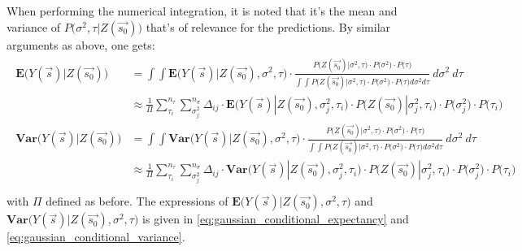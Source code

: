 \documentclass{article}
\begin{document}
When performing the numerical integration, it is noted that it's the mean and variance of $P\big( \sigma^2, \tau | Z(\vec{s_0}) \big)$ that's of relevance for the predictions. By similar arguments as above, one gets:
\begin{align}\label{eq:expected_variance_grf_posterior}
\begin{split}
\mathbf{E} \big( Y(\vec{s}) | Z(\vec{s_0}) \big) &= \int \int \mathbf{E} \big( Y(\vec{s}) | Z(\vec{s_0}), \sigma^2, \tau \big) \cdot \frac{P\big( Z(\vec{s_0}) | \sigma^2, \tau \big) \cdot P\big( \sigma^2 \big) \cdot P\big( \tau \big)}{\int \int P\big( Z(\vec{s_0}) | \sigma^2, \tau \big) \cdot P\big( \sigma^2 \big) \cdot P\big( \tau \big) d\sigma^2 d\tau} \ d\sigma^2 \ d\tau \\
&\approx \frac{1}{\Pi}\sum_{\tau_i}^{n_{\tau}} \sum_{\sigma^2_j}^{n_{\sigma}} \Delta_{ij} \cdot \mathbf{E} \big( Y(\vec{s}) | Z(\vec{s_0}), \sigma^2_j, \tau_i \big) \cdot P\big( Z(\vec{s_0}) | \sigma^2_j, \tau_i \big) \cdot P\big( \sigma^2_j \big) \cdot P\big( \tau_i \big) \\
\mathbf{Var} \big( Y(\vec{s}) | Z(\vec{s_0}) \big) &= \int \int \mathbf{Var} \big( Y(\vec{s}) | Z(\vec{s_0}), \sigma^2, \tau \big) \cdot \frac{P\big( Z(\vec{s_0}) | \sigma^2, \tau \big) \cdot P\big( \sigma^2 \big) \cdot P\big( \tau \big)}{\int \int P\big( Z(\vec{s_0}) | \sigma^2, \tau \big) \cdot P\big( \sigma^2 \big) \cdot P\big( \tau \big) d\sigma^2 d\tau} \ d\sigma^2 \ d\tau \\
&\approx \frac{1}{\Pi}\sum_{\tau_i}^{n_{\tau}} \sum_{\sigma_j^2}^{n_{\sigma}} \Delta_{ij} \cdot \mathbf{Var} \big( Y(\vec{s}) | Z(\vec{s_0}), \sigma^2_j, \tau_i \big) \cdot P\big( Z(\vec{s_0}) | \sigma^2_j, \tau_i \big) \cdot P\big( \sigma^2_j \big) \cdot P\big( \tau_i \big) \\\end{split}
\end{align}
with $\Pi$ defined as before. The expressions of $\mathbf{E} \big( Y(\vec{s}) | Z(\vec{s_0}), \sigma^2, \tau \big)$ and $\mathbf{Var} \big( Y(\vec{s}) | Z(\vec{s_0}), \sigma^2, \tau \big)$ is given in \ref{eq:gaussian_conditional_expectancy} and \ref{eq:gaussian_conditional_variance}.
\end{document}
